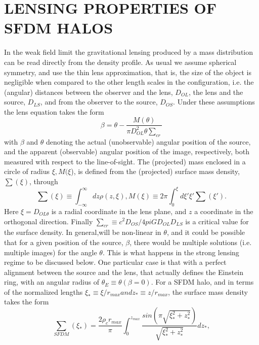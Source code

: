 \documentclass[%
 twocolumn,
 amsmath,amssymb,
 aps,
]{revtex4-2}
\begin{document}
\section{LENSING PROPERTIES OF SFDM HALOS}
In the weak field limit the gravitational lensing produced by a mass distribution can be read directly from
the density profile. As usual we assume spherical symmetry, and use the thin lens approximation, that is, the size
of the object is negligible when compared to the other
length scales in the configuration, i.e. the (angular) distances between the observer and the lens, $D_{OL}$, the lens
and the source, $D_{LS}$, and from the observer to the source,
$D_{OS}$.
Under these assumptions the lens equation takes the
form
\begin{equation}
\beta= \theta-\frac{M(\theta)}{\pi D_{OL}^{2}\theta\sum _{cr}}
    \label{equation 2}
\end{equation}
with $\beta$ and $\theta$ denoting the actual (unobservable) angular
position of the source, and the apparent (observable) angular position of the image, respectively, both measured
with respect to the line-of-sight. The (projected)
mass enclosed in a circle of radius $\xi, M(\xi$), is defined
from the (projected) surface mass density, $\sum(\xi)$, through
\begin{equation}
\sum(\xi)\equiv \int_{-\infty }^{\infty}dz\rho(z,\xi),  M(\xi)\equiv2 \pi \int_{0}^{\xi}d\xi{}'\xi{}'\sum (\xi{}').
    \label{equation 3}
\end{equation}
Here $\xi = D_{OL\theta}$ is a radial coordinate in the lens plane,
and $z$ a coordinate in the orthogonal direction. Finally
$\sum_{cr} \equiv c^{2}D_{OS}/4pi G D_{OL}D_{LS}$ is a critical value for the surface density.
In general,will be non-linear in $\theta$, and it could
be possible that for a given position of the source, $\beta$, there
would be multiple solutions (i.e. multiple images) for
the angle $\theta$. This is what happens in the strong lensing
regime to be discussed below. One particular case is that
with a perfect alignment between the source and the lens,
that actually defines the Einstein ring, with an angular
radius of $\theta_{E} \equiv \theta(\beta =     0)$.
For a SFDM halo, and in terms of the normalized
lengths $\xi_{\ast} \equiv \xi/r_{max} and z_{\ast} \equiv z/r_{max}$, the surface mass density takes the form
\begin{equation}
     \sum _{SFDM}(\xi_{\ast})=\frac{2\rho_{c}r_{max}}{\pi}\int^{z_{max}}_{0} \frac{sin(\pi \sqrt{\xi_{\ast}^{2}+z_{\ast}^{2}})}{\sqrt{\xi_{\ast}^{2}+z_{\ast}^{2}}}dz_{\ast},
     \label{equation 4}
\end{equation}
\end{document}
